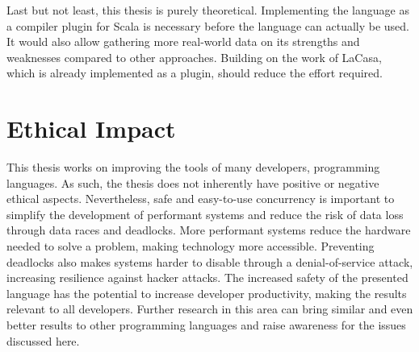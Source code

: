 Last but not least, this thesis is purely theoretical. Implementing the language as a compiler plugin for Scala is necessary before the language can actually be used. It would also allow gathering more real-world data on its strengths and weaknesses compared to other approaches. Building on the work of LaCasa, which is already implemented as a plugin, should reduce the effort required.

\section{Ethical Impact}
This thesis works on improving the tools of many developers, programming languages. As such, the thesis does not inherently have positive or negative ethical aspects. Nevertheless, safe and easy-to-use concurrency is important to simplify the development of performant systems and reduce the risk of data loss through data races and deadlocks. More performant systems reduce the hardware needed to solve a problem, making technology more accessible. Preventing deadlocks also makes systems harder to disable through a denial-of-service attack, increasing resilience against hacker attacks. The increased safety of the presented language has the potential to increase developer productivity, making the results relevant to all developers. Further research in this area can bring similar and even better results to other programming languages and raise awareness for the issues discussed here.
